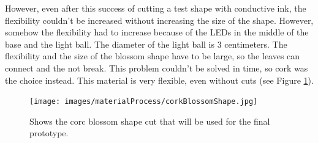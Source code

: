 \documentclass[04.3_buildingProcess.tex]{subfiles}
\begin{document}
\begin{flushleft}
        \noindent
        However, even after this success of cutting a test shape with conductive ink, the flexibility
        couldn't be increased without increasing the size of the shape. However, somehow the flexibility 
        had to increase because of the LEDs in the middle of the base and the light ball. 
        The diameter of the light ball is 3 centimeters. The flexibility and the size of the blossom 
        shape have to be large, so the leaves can connect and the not break. This problem couldn't 
        be solved in time, so cork was the choice instead. This material is very flexible, even 
        without cuts (see Figure \ref{fig:corkTest}).\\

        \begin{figure}[H]
            \centering
                \texttt{[image: images/materialProcess/corkBlossomShape.jpg]}
                \caption{Shows the corc blossom shape cut that will be used for the final prototype.}
                \label{fig:corkTest}
        \end{figure}
    \end{flushleft}
\end{document}
